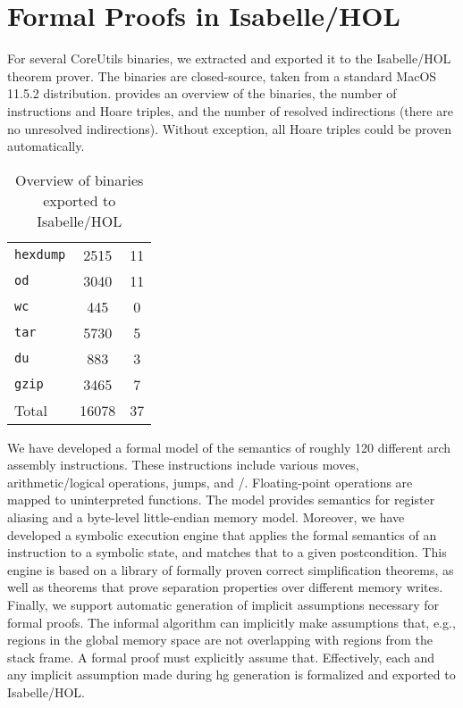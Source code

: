 \section{Formal Proofs in Isabelle/HOL}\label{sec:not-me-proofs}
For several CoreUtils binaries, we extracted  and exported it to the Isabelle/HOL theorem prover.
The binaries are closed-source, taken from a standard MacOS 11.5.2 distribution.
 provides an overview of the binaries, the number of instructions and Hoare triples, and the number of resolved indirections (there are no unresolved indirections).
Without exception, all Hoare triples could be proven automatically.

\begin{table}
  \centering
  \caption{Overview of binaries exported to Isabelle/HOL}
  \label{tab:isa}
  \begin{tabular}{lSS}
    \toprule
     & {} & {}\\
    \midrule
    \texttt{hexdump} & 2515 & 11 \\
    \texttt{od}      & 3040 & 11 \\
    \texttt{wc}      &  445 &  0 \\
    \texttt{tar}     & 5730 & 5 \\
    \texttt{du}      &  883 & 3\\
    \texttt{gzip}    & 3465 & 7\\
    \midrule
    Total            & 16078 & 37 \\
    \bottomrule
  \end{tabular}
\end{table}

We have developed a formal model of the semantics of roughly \num{120} different \gls{arch} assembly instructions.
These instructions include various moves, arithmetic/logical operations, jumps, and /.
Floating-point operations are mapped to uninterpreted functions.
The model provides semantics for register aliasing and a byte-level little-endian memory model.
Moreover, we have developed a symbolic execution engine that applies the formal semantics of an instruction to a symbolic state, and matches that to a given postcondition.
This engine is based on a library of formally proven correct simplification theorems, as well as theorems that prove separation properties over different memory writes.
Finally, we support automatic generation of implicit assumptions necessary for formal proofs.
The informal algorithm can implicitly make assumptions that, e.g., regions in the global memory space are not overlapping with regions from the stack frame.
A formal proof must explicitly assume that.
Effectively, each and any implicit assumption made during \ac{hg} generation is formalized and exported to Isabelle/HOL.

